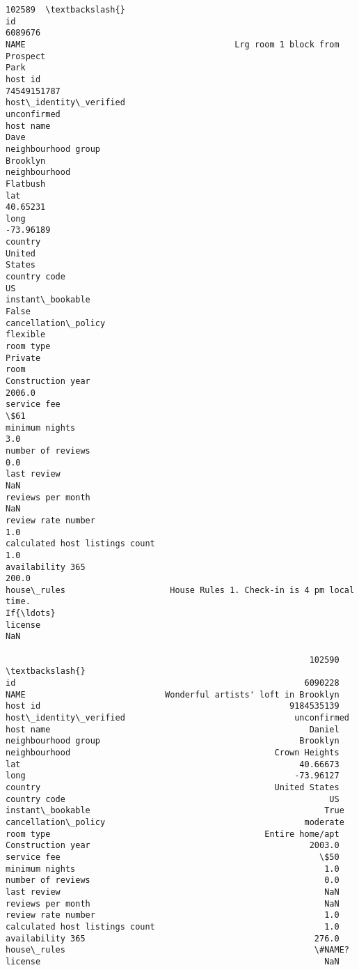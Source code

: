 \documentclass[11pt]{article}
\makeatletter
\newcommand{\boxspacing}{\kern\kvtcb@left@rule\kern\kvtcb@boxsep}
\newcommand{\prompt}[4]{
        {\ttfamily\llap{{\color{#2}[#3]:\hspace{3pt}#4}}\vspace{-\baselineskip}}
    }
\makeatother
\begin{document}
            \begin{tcolorbox}[breakable, size=fbox, boxrule=.5pt, pad at break*=1mm, opacityfill=0]
\prompt{Out}{outcolor}{ }{\boxspacing}
\begin{Verbatim}[commandchars=\\\{\}]
102589  \textbackslash{}
id
6089676
NAME                                          Lrg room 1 block from Prospect
Park
host id
74549151787
host\_identity\_verified
unconfirmed
host name
Dave
neighbourhood group
Brooklyn
neighbourhood
Flatbush
lat
40.65231
long
-73.96189
country                                                             United
States
country code
US
instant\_bookable
False
cancellation\_policy
flexible
room type                                                            Private
room
Construction year
2006.0
service fee                                                                  \$61
minimum nights
3.0
number of reviews
0.0
last review
NaN
reviews per month
NaN
review rate number
1.0
calculated host listings count
1.0
availability 365
200.0
house\_rules                     House Rules 1. Check-in is 4 pm local time.
If{\ldots}
license
NaN

                                                             102590  \textbackslash{}
id                                                          6090228
NAME                            Wonderful artists' loft in Brooklyn
host id                                                  9184535139
host\_identity\_verified                                  unconfirmed
host name                                                    Daniel
neighbourhood group                                        Brooklyn
neighbourhood                                         Crown Heights
lat                                                        40.66673
long                                                      -73.96127
country                                               United States
country code                                                     US
instant\_bookable                                               True
cancellation\_policy                                        moderate
room type                                           Entire home/apt
Construction year                                            2003.0
service fee                                                    \$50
minimum nights                                                  1.0
number of reviews                                               0.0
last review                                                     NaN
reviews per month                                               NaN
review rate number                                              1.0
calculated host listings count                                  1.0
availability 365                                              276.0
house\_rules                                                  \#NAME?
license                                                         NaN


\end{Verbatim}
\end{tcolorbox}
\end{document}
